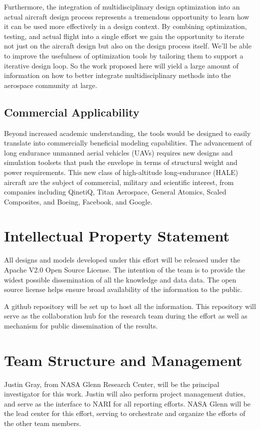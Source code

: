 \documentclass[]{aiaa-tc}
\begin{document}
    Furthermore, the integration of multidisciplinary design optimization into an actual aircraft design process represents
    a tremendous opportunity to learn how it can be used more effectively in a design context. By combining optimization, 
    testing, and actual flight into a single effort we gain the opportunity to iterate not just on the aircraft 
    design but also on the design process itself. We'll be able to improve the usefulness of optimization tools by 
    tailoring them to support a iterative design loop. So the work proposed here will yield a large amount 
    of information on how to better integrate multidisciplinary methods into the aerospace community at large. 

    \subsection{Commercial Applicability}
    Beyond increased academic understanding, the tools would be designed to easily translate into commercially beneficial
    modeling capabilities. The advancement of long endurance unmanned aerial vehicles (UAVs) requires new designs
    and simulation toolsets that push the envelope in terms of structural weight and power requirements. 
    This new class of high-altitude long-endurance (HALE) aircraft are the subject of commercial,
    military and scientific interest, from companies including QinetiQ, Titan Aerospace, General Atomics, Scaled Composites, and Boeing, 
    Facebook, and Google. 

  
\section{Intellectual Property Statement}
    All designs and models developed under this effort will be released under the Apache V2.0 Open Source License. The intention 
    of the team is to provide the widest possible dissemination of all the knowledge and data data. The open source license helps 
    ensure broad availability of the information to the public. 

    A github repository will be set up to host all the information. This repository will serve as the collaboration 
    hub for the research team during the effort as well as mechanism for public dissemination of the results. 

\section{Team Structure and Management}
    Justin Gray, from NASA Glenn Research Center, will be the principal investigator for this work. Justin will also perform 
    project management duties, and serve as the interface to NARI for all reporting efforts. NASA Glenn will be the lead 
    center for this effort, serving to orchestrate and organize the efforts of the other team members. 
\end{document}
